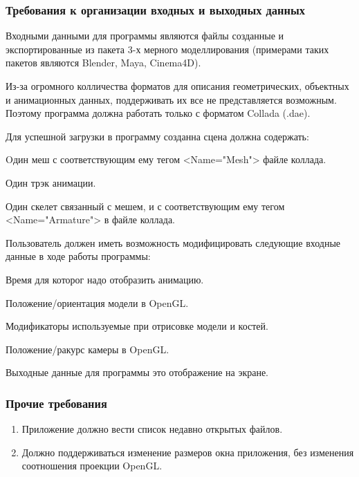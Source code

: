 \subsubsection{Требования к организации входных и выходных данных}
\begin{my_enumerate}
\item Входными данными для программы являются файлы  созданные и экспортированные из пакета 3-х мерного моделлирования (примерами таких пакетов являются Blender, Maya, Cinema4D).
\item Из-за огромного колличества форматов для описания геометрических, объектных и анимационных данных, поддерживать их все не представляется возможным. Поэтому программа должна работать только с форматом Collada (.dae).
\item Для успешной загрузки в программу созданна сцена должна содержать:
\begin{my_enumerate}
\item Oдин меш с соответствующим ему тегом <Name="Mesh"> файле коллада.
\item Один трэк анимации.
\item Один скелет связанный с мешем, и с соответствующим ему тегом <Name="Armature"> в файле коллада.
\end{my_enumerate}
\item Пользователь должен иметь возможность модифицировать следующие входные данные в ходе работы программы:
\begin{my_enumerate}
\item Время для которог надо отобразить анимацию.
\item Положение/ориентация модели в OpenGL.
\item Модификаторы используемые при отрисовке модели и костей.
\item Положение/ракурс камеры в OpenGL.
\end{my_enumerate}
\item Выходные данные для программы это отображение на экране.
\end{my_enumerate}

\subsubsection{Прочие требования}
\begin{enumerate}
\item Приложение должно вести список недавно открытых файлов.
\item Должно поддерживаться изменение размеров окна приложения, без изменения соотношения проекции OpenGL.
\end{enumerate}

